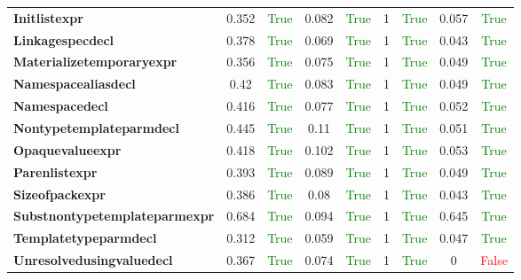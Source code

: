 \documentclass{article}
\begin{document}
\begin{xltabular}{\textwidth}{lcccccccc}
\textbf{{\fontsize{10}{12}\selectfont Initlistexpr}}& 0.352&\textcolor{green}{True}& 0.082&\textcolor{green}{True}& 1&\textcolor{green}{True}& 0.057&\textcolor{green}{True} \\[0.5ex]
\textbf{{\fontsize{10}{12}\selectfont Linkagespecdecl}}& 0.378&\textcolor{green}{True}& 0.069&\textcolor{green}{True}& 1&\textcolor{green}{True}& 0.043&\textcolor{green}{True} \\[0.5ex]
\textbf{{\fontsize{10}{12}\selectfont Materializetemporaryexpr}}& 0.356&\textcolor{green}{True}& 0.075&\textcolor{green}{True}& 1&\textcolor{green}{True}& 0.049&\textcolor{green}{True} \\[0.5ex]
\textbf{{\fontsize{10}{12}\selectfont Namespacealiasdecl}}& 0.42&\textcolor{green}{True}& 0.083&\textcolor{green}{True}& 1&\textcolor{green}{True}& 0.049&\textcolor{green}{True} \\[0.5ex]
\textbf{{\fontsize{10}{12}\selectfont Namespacedecl}}& 0.416&\textcolor{green}{True}& 0.077&\textcolor{green}{True}& 1&\textcolor{green}{True}& 0.052&\textcolor{green}{True} \\[0.5ex]
\textbf{{\fontsize{10}{12}\selectfont Nontypetemplateparmdecl}}& 0.445&\textcolor{green}{True}& 0.11&\textcolor{green}{True}& 1&\textcolor{green}{True}& 0.051&\textcolor{green}{True} \\[0.5ex]
\textbf{{\fontsize{10}{12}\selectfont Opaquevalueexpr}}& 0.418&\textcolor{green}{True}& 0.102&\textcolor{green}{True}& 1&\textcolor{green}{True}& 0.053&\textcolor{green}{True} \\[0.5ex]
\textbf{{\fontsize{10}{12}\selectfont Parenlistexpr}}& 0.393&\textcolor{green}{True}& 0.089&\textcolor{green}{True}& 1&\textcolor{green}{True}& 0.049&\textcolor{green}{True} \\[0.5ex]
\textbf{{\fontsize{10}{12}\selectfont Sizeofpackexpr}}& 0.386&\textcolor{green}{True}& 0.08&\textcolor{green}{True}& 1&\textcolor{green}{True}& 0.043&\textcolor{green}{True} \\[0.5ex]
\textbf{{\fontsize{10}{12}\selectfont Substnontypetemplateparmexpr}}& 0.684&\textcolor{green}{True}& 0.094&\textcolor{green}{True}& 1&\textcolor{green}{True}& 0.645&\textcolor{green}{True} \\[0.5ex]
\textbf{{\fontsize{10}{12}\selectfont Templatetypeparmdecl}}& 0.312&\textcolor{green}{True}& 0.059&\textcolor{green}{True}& 1&\textcolor{green}{True}& 0.047&\textcolor{green}{True} \\[0.5ex]
\textbf{{\fontsize{10}{12}\selectfont Unresolvedusingvaluedecl}}& 0.367&\textcolor{green}{True}& 0.074&\textcolor{green}{True}& 1&\textcolor{green}{True}& 0&\textcolor{red}{False} \\[0.5ex]

\end{xltabular}
\end{document}
